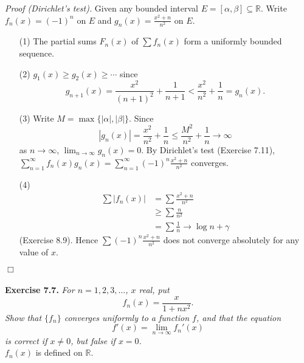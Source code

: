 \documentclass{article}
\begin{document}
\emph{Proof (Dirichlet's test).}
Given any bounded interval $E = [\alpha,\beta] \subseteq \mathbb{R}$.
Write $f_n(x) = (-1)^n$ on $E$ and $g_n(x) = \frac{x^2+n}{n^2}$ on $E$.
\begin{enumerate}
  \item[(1)]
  The partial sums $F_n(x)$ of $\sum f_n(x)$ form a uniformly bounded sequence.

  \item[(2)]
  $g_1(x) \geq g_2(x) \geq \cdots$ since
  \[
    g_{n+1}(x)
    = \frac{x^2}{(n+1)^2} + \frac{1}{n+1}
    < \frac{x^2}{n^2} + \frac{1}{n}
    = g_n(x).
  \]

  \item[(3)]
  Write $M = \max\{|\alpha|,|\beta|\}$.
  Since
  \[
    |g_n(x)|
    = \frac{x^2}{n^2} + \frac{1}{n}
    \leq \frac{M^2}{n^2} + \frac{1}{n} \to \infty
  \]
  as $n \to \infty$,
  $\lim_{n \to \infty} g_n(x) = 0$.
  By Dirichlet's test (Exercise 7.11),
  $\sum_{n=1}^{\infty} f_n(x) g_n(x) = \sum_{n=1}^{\infty} (-1)^n \frac{x^2+n}{n^2}$
  converges.

  \item[(4)]
  \begin{align*}
    \sum |f_n(x)|
    &= \sum \frac{x^2+n}{n^2} \\
    &\geq \sum \frac{n}{n^2} \\
    &= \sum \frac{1}{n} \to \log n + \gamma
  \end{align*}
  (Exercise 8.9).
  Hence $\sum (-1)^n \frac{x^2+n}{n^2}$ does not converge absolutely for any value of $x$.
\end{enumerate}
$\Box$ \\\\






\textbf{Exercise 7.7.}
\emph{For $n=1,2,3,\ldots$, $x$ real, put
\[
  f_n(x) = \frac{x}{1+nx^2}.
\]
Show that $\{f_n\}$ converges uniformly to a function $f$,
and that the equation
\[
  f'(x) = \lim_{n \to \infty} f_n'(x)
\]
is correct if $x \neq 0$, but false if $x = 0$.} \\

$f_n(x)$ is defined on $\mathbb{R}$. \\
\end{document}
